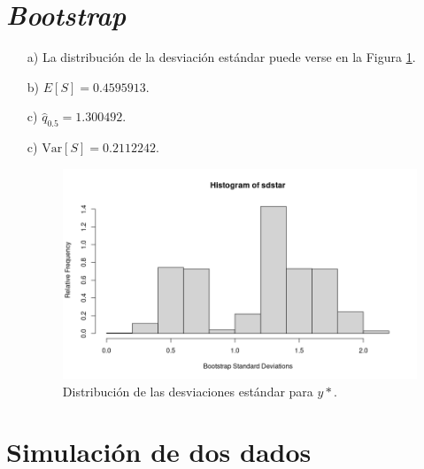 \documentclass[11pt,letterpaper]{article}
\begin{document}
	\section{\textit{Bootstrap}}
	
	\begin{itemize}
		\item[a)] La distribución de la desviación estándar puede verse en la Figura \ref{fig:p3a}.
		\item[b)] $E[S] = 0.4595913$.
		\item[c)] $\hat{q}_{0.5} = 1.300492$.
		\item[c)] $ \text{Var}[S] = 0.2112242$.
		\begin{figure}[h]
			\centering
			\includegraphics[width=0.7\linewidth]{../img/p3_a}
			\caption{Distribución de las desviaciones estándar para $y*$.}
			\label{fig:p3a}
		\end{figure}
		
	\end{itemize}

	\section{Simulación de dos dados}
	
\end{document}
